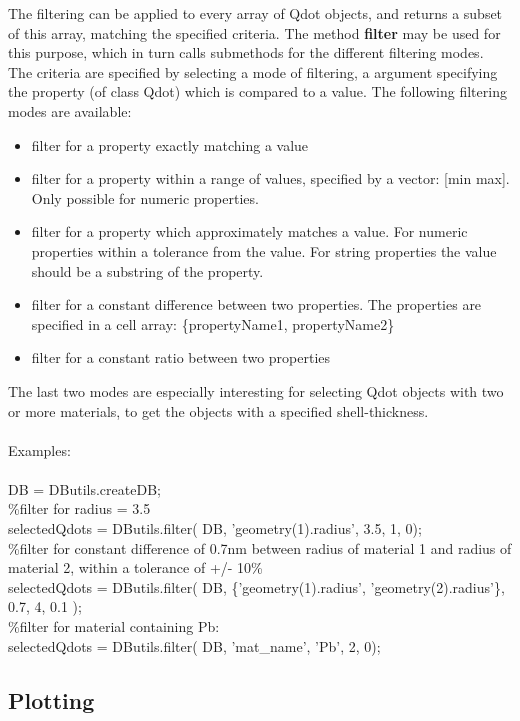 The filtering can be applied to every array of Qdot objects, and returns a subset of this array, matching the specified criteria.
The method \textbf{filter} may be used for this purpose, which in turn calls submethods for the different filtering modes.
The criteria are specified by selecting a mode of filtering, a argument specifying the property (of class Qdot) which is compared to a value.
The following filtering modes are available:\\
\begin{itemize}
\item filter for a property exactly matching a value
\item filter for a property within a range of values, specified by a vector: [min max]. Only possible for numeric properties.
\item filter for a property which approximately matches a value. For numeric properties within a tolerance from the value. For string properties the value should be a substring of the property.
\item filter for a constant difference between two properties. The properties are specified in a cell array: \{propertyName1, propertyName2\}
\item filter for a constant ratio between two properties
\end{itemize}
The last two modes are especially interesting for selecting Qdot objects with two or more materials, to get the objects with a specified shell-thickness.\\
\\
Examples:\\\\
DB = DButils.createDB;\\
\%filter for radius = 3.5 \\
selectedQdots = DButils.filter( DB, 'geometry(1).radius',  3.5, 1, 0);\\
\%filter for constant difference of 0.7nm between radius of material 1 and radius of material 2, within a tolerance of +/- 10\%\\
selectedQdots = DButils.filter( DB, \{'geometry(1).radius', 'geometry(2).radius'\}, 0.7, 4, 0.1 );\\
\%filter for material containing Pb:\\
selectedQdots = DButils.filter( DB, 'mat\_name', 'Pb', 2, 0);\\

\subsection{Plotting}

